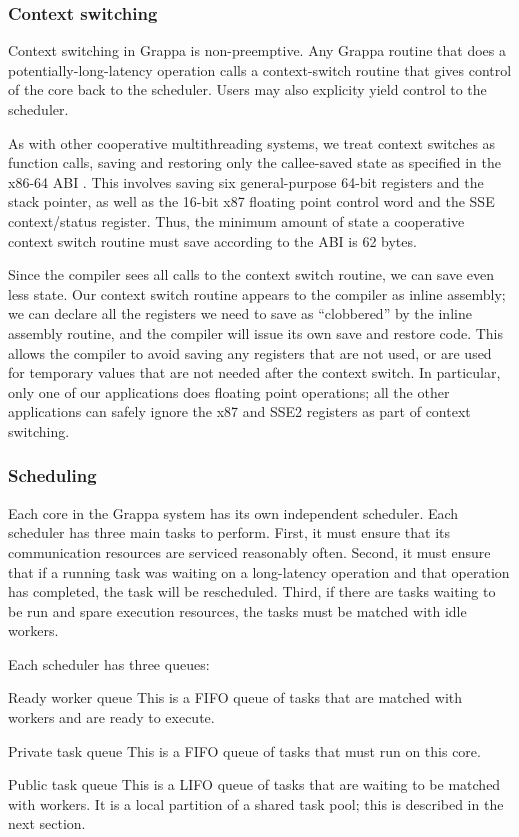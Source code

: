 \subsubsection{Context switching}

Context switching in Grappa is non-preemptive. Any Grappa routine that
does a potentially-long-latency operation calls a context-switch
routine that gives control of the core back to the scheduler. Users
may also explicity yield control to the scheduler.

As with other cooperative multithreading systems, we treat context
switches as function calls, saving and restoring only the callee-saved
state as specified in the x86-64 ABI . This involves saving
six general-purpose 64-bit registers and the stack pointer, as well as
the 16-bit x87 floating point control word and the SSE context/status
register. Thus, the minimum amount of state a cooperative context
switch routine must save according to the ABI is 62 bytes.

Since the compiler sees all calls to the context switch routine, we
can save even less state. Our context switch routine appears to the
compiler as inline assembly; we can declare all the registers we need
to save as ``clobbered'' by the inline assembly routine, and the
compiler will issue its own save and restore code. This allows the
compiler to avoid saving any registers that are not used, or are used
for temporary values that are not needed after the context switch. In
particular, only one of our applications does floating point
operations; all the other applications can safely ignore the x87 and
SSE2 registers as part of context switching.

\subsubsection{Scheduling}

Each core in the Grappa system has its own independent scheduler. Each
scheduler has three main tasks to perform.  First, it must ensure that
its communication resources are serviced reasonably often. Second, it
must ensure that if a running task was waiting on a long-latency
operation and that operation has completed, the task will be
rescheduled. Third, if there are tasks waiting to be run and spare
execution resources, the tasks must be matched with idle workers.

Each scheduler has three queues:
\begin{description}
\item{Ready worker queue} This is a FIFO queue of tasks that are
  matched with workers and are ready to execute.
\item{Private task queue} This is a FIFO queue of tasks that must run on this core.
\item{Public task queue} This is a LIFO queue of tasks that are
  waiting to be matched with workers. It is a local partition of a shared
  task pool; this is described in the next section.
\end{description}


